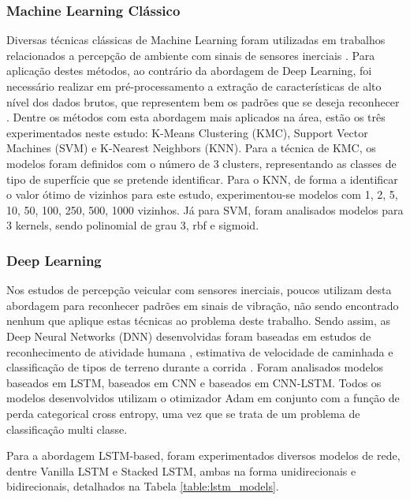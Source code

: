\subsubsection{Machine Learning Clássico}

Diversas técnicas clássicas de Machine Learning foram utilizadas em trabalhos relacionados a percepção de ambiente com sinais de sensores inerciais \cite{menegazzo2018}. Para aplicação destes métodos, ao contrário da abordagem de Deep Learning, foi necessário realizar em pré-processamento a extração de características de alto nível dos dados brutos, que representem bem os padrões que se deseja reconhecer \cite{Goodfellow2016}. Dentre os métodos com esta abordagem mais aplicados na área, estão os três experimentados neste estudo: K-Means Clustering (KMC), Support Vector Machines (SVM) e K-Nearest Neighbors (KNN). Para a técnica de KMC, os modelos foram definidos com o número de 3 clusters, representando as classes de tipo de superfície que se pretende identificar. Para o KNN, de forma a identificar o valor ótimo de vizinhos para este estudo, experimentou-se modelos com 1, 2, 5, 10, 50, 100, 250, 500, 1000 vizinhos. Já para SVM, foram analisados modelos para 3 kernels, sendo polinomial de grau 3, rbf e sigmoid.

\subsubsection{Deep Learning}

Nos estudos de percepção veicular com sensores inerciais, poucos utilizam desta abordagem para reconhecer padrões em sinais de vibração, não sendo encontrado nenhum que aplique estas técnicas ao problema deste trabalho. Sendo assim, as Deep Neural Networks (DNN) desenvolvidas foram baseadas em estudos de reconhecimento de atividade humana \cite{Deep2019, Alemayoh2019, Chen2015, Yang2018, Zebin2018, Zebin2019, Wang2019, Ahmad2019}, estimativa de velocidade de caminhada \cite{Shrestha2018} e classificação de tipos de terreno durante a corrida \cite{Dixon2019}. Foram analisados modelos baseados em LSTM, baseados em CNN e baseados em CNN-LSTM. Todos os modelos desenvolvidos utilizam o otimizador Adam em conjunto com a função de perda categorical cross entropy, uma vez que se trata de um problema de classificação multi classe. 

Para a abordagem LSTM-based, foram experimentados diversos modelos de rede, dentre Vanilla LSTM e Stacked LSTM, ambas na forma unidirecionais e bidirecionais, detalhados na Tabela \ref{table:lstm_models}. 

